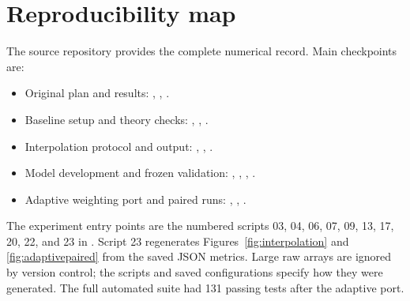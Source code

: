 \documentclass[11pt,a4paper]{article}
\begin{document}
\appendix
\section{Reproducibility map}
\begingroup\small
The source repository provides the complete numerical record. Main checkpoints are:
\begin{itemize}\raggedright
\item Original plan and results: , , .
\item Baseline setup and theory checks: , , .
\item Interpolation protocol and output: , , .
\item Model development and frozen validation: , , , .
\item Adaptive weighting port and paired runs: , , .
\end{itemize}
The experiment entry points are the numbered scripts 03, 04, 06, 07, 09, 13, 17, 20, 22, and 23 in . Script 23 regenerates Figures~\ref{fig:interpolation} and \ref{fig:adaptivepaired} from the saved JSON metrics. Large raw arrays are ignored by version control; the scripts and saved configurations specify how they were generated. The full automated suite had 131 passing tests after the adaptive port.
\endgroup
\end{document}
